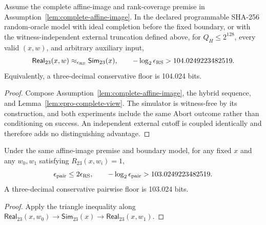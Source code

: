 \begin{theorem}
\label{thm:real-vs-sim23}
Assume the complete affine-image and rank-coverage premise in
Assumption~\ref{lem:complete-affine-image}.  In the declared programmable
SHA-256 random-oracle model with ideal completion before the fixed boundary,
or with the witness-independent external truncation defined above, for
\(Q_H\le2^{128}\), every valid \((x,w)\), and arbitrary auxiliary input,
\[
 \mathsf{Real}_{23}(x,w)\approx_{\epsilon_{\rm RS}}
 \mathsf{Sim}_{23}(x),
 \qquad
 -\log_2\epsilon_{\rm RS}>104.0249223482519.
\]
Equivalently, a three-decimal conservative floor is 104.024 bits.
\end{theorem}

\begin{proof}
Compose Assumption~\ref{lem:complete-affine-image}, the hybrid sequence, and
Lemma~\ref{lem:epro-complete-view}.  The simulator is witness-free by its
construction, and both experiments include the same Abort outcome rather
than conditioning on success.  An independent external cutoff is coupled
identically and therefore adds no distinguishing advantage.
\end{proof}

\begin{corollary}
\label{cor:pairwise-hiding}
Under the same affine-image premise and boundary model, for any fixed \(x\)
and any \(w_0,w_1\) satisfying \(R_{23}(x,w_i)=1\),
\[
 \epsilon_{\rm pair}\le2\epsilon_{\rm RS},
 \qquad
 -\log_2\epsilon_{\rm pair}>103.0249223482519.
\]
A three-decimal conservative pairwise floor is 103.024 bits.
\end{corollary}

\begin{proof}
Apply the triangle inequality along
\(
 \mathsf{Real}_{23}(x,w_0)\rightarrow
 \mathsf{Sim}_{23}(x)\rightarrow
 \mathsf{Real}_{23}(x,w_1)
\).
\end{proof}
